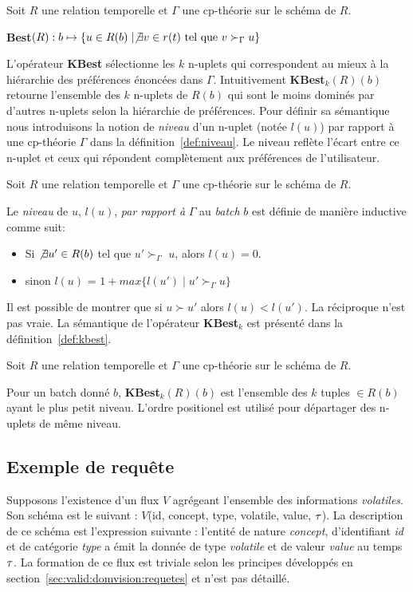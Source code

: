 \begin{defi}[Best]\label{def:best}
Soit $R$ une relation temporelle et $\Gamma$ une cp-th\'eorie sur le schéma de $R$. 

\textbf{Best}$(R): b\mapsto \{u \in R(b) \mid \not\exists v \in r(t) \textrm{ tel que } v \succ_\Gamma u \}$
\end{defi}

L'opérateur \textbf{KBest} sélectionne les $k$ n-uplets qui correspondent au mieux à la hiérarchie des préférences énoncées dans $\Gamma$. Intuitivement \textbf{KBest}$_k(R)(b)$ retourne l'ensemble des $k$ n-uplets de $R(b)$ qui sont le moins dominés par d'autres n-uplets selon la hiérarchie de préférences. Pour définir sa sémantique nous introduisons la notion de \textit{niveau} d'un n-uplet (notée $l(u)$) par rapport à une cp-théorie $\Gamma$ dans la définition~\ref{def:niveau}. Le niveau reflète l'écart entre ce n-uplet et ceux qui répondent complètement aux préférences de l'utilisateur.

\begin{defi}[Niveau]\label{def:niveau}
Soit $R$ une relation temporelle et $\Gamma$ une cp-th\'eorie sur le schéma de $R$.

Le \textit{niveau} de $u$, $l(u)$, \textit{par rapport à} $\Gamma$ au \textit{batch} $b$ est définie de manière inductive comme suit:
 \begin{itemize}
 \item Si $\not\exists u' \in R(b)$ tel que $u' \succ_\Gamma$ $u$, alors $l(u) = 0$.
 \item sinon $l(u)$ = $1+max \{l(u') \mid u' \succ_\Gamma u\} $
 \end{itemize}
\end{defi}

Il est possible de montrer que si $u \succ u'$ alors $l(u) < l(u')$. La réciproque n'est pas vraie. La sémantique de l'opérateur \textbf{KBest}$_k$ est présenté dans la définition~\ref{def:kbest}.

\begin{defi}[KBest]\label{def:kbest}
Soit $R$ une relation temporelle et $\Gamma$ une cp-th\'eorie sur le schéma de $R$. 

Pour un batch donné $b$, \textbf{KBest}$_k(R)(b)$ est l'ensemble des $k$ tuples $\in R(b)$ ayant le plus petit niveau. L'ordre positionel est utilisé pour départager des n-uplets de même niveau.
\end{defi}

\subsection{Exemple de requête}
Supposons l'existence d'un flux $V$ agrégeant l'ensemble des informations \textit{volatiles}. Son schéma est le suivant : $V$(id, concept, type, volatile, value, $\tau$). La description de ce schéma est l'expression suivante : l'entité de nature \textit{concept}, d'identifiant \textit{id} et de catégorie \textit{type} a émit la donnée de type \textit{volatile} et de valeur \textit{value} au temps $\tau$. La formation de ce flux est triviale selon les principes développés en section~\ref{sec:valid:domvision:requetes} et n'est pas détaillé.

